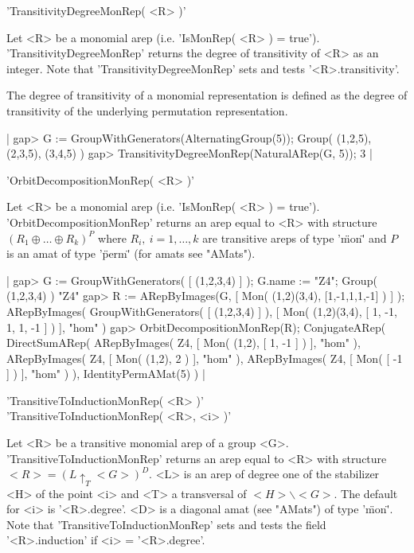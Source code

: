 'TransitivityDegreeMonRep( <R> )'

Let <R> be a monomial arep (i.e. 'IsMonRep( <R> ) = true').
'TransitivityDegreeMonRep' returns the degree of transitivity
of <R> as an integer.
Note that 'TransitivityDegreeMonRep' sets and tests '<R>.transitivity'.

The degree of transitivity of a monomial representation is defined 
as the degree of transitivity of the underlying permutation 
representation.

|    gap> G := GroupWithGenerators(AlternatingGroup(5));
    Group( (1,2,5), (2,3,5), (3,4,5) )
    gap> TransitivityDegreeMonRep(NaturalARep(G, 5));
    3 |


'OrbitDecompositionMonRep( <R> )'

Let <R> be a monomial arep (i.e. 'IsMonRep( <R> ) = true').
'OrbitDecompositionMonRep' returns an arep equal to <R> with 
structure $(R_1\oplus\dots\oplus R_k)^P$ 
where $R_i,\ i = 1,\dots,k$ are transitive areps of type '\"mon\"' and 
$P$ is an amat of type '\"perm\"' (for amats see "AMats").

|    gap> G := GroupWithGenerators( [ (1,2,3,4) ] ); G.name := "Z4";
    Group( (1,2,3,4) )
    "Z4"
    gap> R := ARepByImages(G, [ Mon( (1,2)(3,4), [1,-1,1,1,-1] ) ] );
    ARepByImages(
      GroupWithGenerators( [ (1,2,3,4) ] ),
      [ Mon( (1,2)(3,4), [ 1, -1, 1, 1, -1 ] ) ],
      "hom"
    )
    gap> OrbitDecompositionMonRep(R);
    ConjugateARep(
      DirectSumARep(
        ARepByImages(
          Z4,
          [ Mon( (1,2), [ 1, -1 ] ) ],
          "hom"
        ),
        ARepByImages(
          Z4,
          [ Mon( (1,2), 2 ) ],
          "hom"
        ),
        ARepByImages(
          Z4,
          [ Mon( [ -1 ] ) ],
          "hom"
        )
      ),
      IdentityPermAMat(5)
    ) |


'TransitiveToInductionMonRep( <R> )'\\
'TransitiveToInductionMonRep( <R>, <i> )'

Let <R> be a transitive monomial arep of a group <G>.
'TransitiveToInductionMonRep' returns an arep equal to <R> 
with structure $<R> = (L\uparrow_T <G>)^D$. 
<L> is an arep of degree one of 
the stabilizer <H> of the point <i> and <T> a transversal 
of $<H>\backslash <G>$. The default for <i> is '<R>.degree'.
<D> is a diagonal amat (see "AMats") of type '\"mon\"'. 
Note that 'TransitiveToInductionMonRep' sets and tests the
field '<R>.induction' if <i> = '<R>.degree'.

